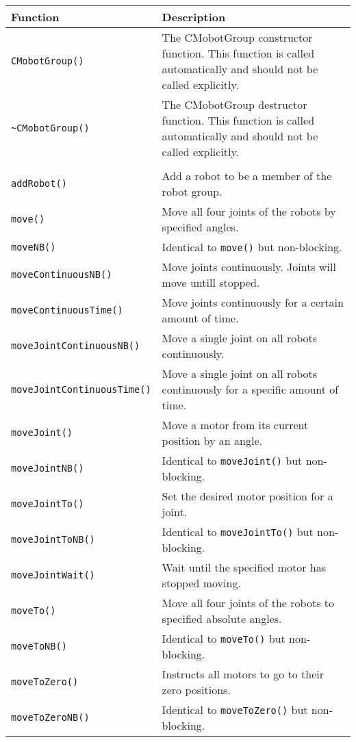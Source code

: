 \begin{tabular}{p{1.75in}p{4.5in}}
\hline
Function & Description \\
\hline
\texttt{CMobotGroup()} & The CMobotGroup constructor function. This function
is called automatically and should not be called explicitly. \\
\texttt{\textasciitilde CMobotGroup()} & The CMobotGroup destructor function. This function
is called automatically and should not be called explicitly. \\
& \\
\texttt{addRobot()} & Add a robot to be a member of the robot group. \\
\texttt{move()} & Move all four joints of the robots by specified angles. \\
\texttt{moveNB()} & Identical to \texttt{move()} but non-blocking. \\
\texttt{moveContinuousNB()} & Move joints continuously. Joints will move untill stopped.\\
\texttt{moveContinuousTime()} & Move joints continuously for a certain amount of time.\\
\texttt{moveJointContinuousNB()} & Move a single joint on all robots continuously. \\
\texttt{moveJointContinuousTime()} & Move a single joint on all robots continuously for a specific amount of time. \\
\texttt{moveJoint()} & Move a motor from its current position by an angle. \\
\texttt{moveJointNB()} & Identical to \texttt{moveJoint()} but non-blocking. \\
\texttt{moveJointTo()} & Set the desired motor position for a joint. \\
\texttt{moveJointToNB()} & Identical to \texttt{moveJointTo()} but non-blocking. \\
\texttt{moveJointWait()} & Wait until the specified motor has stopped moving. \\
\texttt{moveTo()} & Move all four joints of the robots to specified absolute angles. \\
\texttt{moveToNB()} & Identical to \texttt{moveTo()} but non-blocking. \\
\texttt{moveToZero()} & Instructs all motors to go to their zero positions. \\
\texttt{moveToZeroNB()} & Identical to \texttt{moveToZero()} but non-blocking. \\

\end{tabular}
